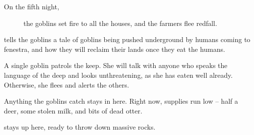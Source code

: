\begin{multicols}{2}
\begin{description}
  \item[On the fifth night,]
  the goblins set fire to all the houses, and the farmers flee \gls{redfall}.
\end{description}




 tells the goblins a tale of goblins being pushed underground by humans coming to \gls{fenestra}, and how they will reclaim their lands once they eat the humans.


\goblin


A single goblin patrols the keep.
She will talk with anyone who speaks the language of the \gls{deep} and looks unthreatening, as she has eaten well already.
Otherwise, she flees and alerts the others.


Anything the goblins catch stays in here.
Right now, supplies run low -- half a deer, some stolen milk, and bits of dead otter.


 stays up here, ready to throw down massive rocks.

\end{multicols}

\begin{multicols}{2}


\columnbreak


\end{multicols}

